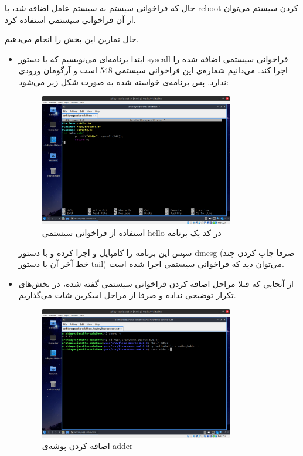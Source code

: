 \documentclass[12pt]{article}
\begin{document}
\begin{enumerate}
        
        \end{enumerate}
        
        حال که فراخوانی سیستم به سیستم عامل اضافه شد، با 
        \textenglish{reboot}
        کردن سیستم می‌توان از آن فراخوانی سیستمی استفاده کرد.

        حال تمارین این بخش را انجام می‌دهیم.

        \begin{itemize}
        \item ابتدا برنامه‌ای می‌نویسیم که با دستور
        \textenglish{syscall}
        فراخوانی سیستمی اضافه شده را اجرا کند.
        می‌دانیم شماره‌ی این فراخوانی سیستمی 
        \textenglish{548}
        است و آرگومان ورودی ندارد. پس برنامه‌ی خواسته شده به صورت شکل زیر می‌شود:

        \begin{figure}[H]
		\centering
		\includegraphics[width=0.8\textwidth]{report2-resources/33.png}
		\caption{استفاده از فراخوانی سیستمی \textenglish{hello} در کد یک برنامه}
	\end{figure}

        سپس این برنامه را کامپایل و اجرا کرده و با دستور 
        \textenglish{dmesg}
        (صرفا چاپ کردن چند خط آخر آن با دستور 
        \textenglish{tail})
        می‌توان دید که فراخوانی‌ سیستمی اجرا شده است.

        \item 
        از آنجایی که قبلا مراحل اضافه کردن فراخوانی سیستمی گفته شده، در بخش‌های تکرار توضیحی نداده و صرفا از مراحل اسکرین شات می‌گذاریم.

        \begin{figure}[H]
		\centering
		\includegraphics[width=0.8\textwidth]{report2-resources/35.png}
		\caption{اضافه کردن پوشه‌ی \textenglish{adder}}
	\end{figure}


\end{itemize}
\end{document}
